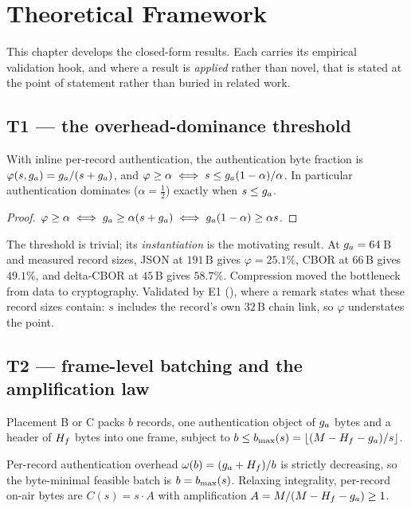 \chapter{Theoretical Framework}\label{ch:theory}

This chapter develops the closed-form results. Each carries its empirical validation hook, and
where a result is \emph{applied} rather than novel, that is stated at the point of statement rather
than buried in related work.

\section{T1 --- the overhead-dominance threshold}

\begin{theorem}\label{thm:t1}
With inline per-record authentication, the authentication byte fraction is
$\varphi(s, g_a) = g_a/(s + g_a)$, and $\varphi \geq \alpha \iff s \leq g_a(1-\alpha)/\alpha$. In
particular authentication dominates ($\alpha = \tfrac12$) exactly when $s \leq g_a$.
\end{theorem}

\begin{proof}
$\varphi \geq \alpha \iff g_a \geq \alpha(s + g_a) \iff g_a(1-\alpha) \geq \alpha s$.
\end{proof}

The threshold is trivial; its \emph{instantiation} is the motivating result. At $g_a = 64$\,B and
measured record sizes, JSON at $191$\,B gives $\varphi = 25.1\%$, CBOR at $66$\,B gives $49.1\%$,
and delta-CBOR at $45$\,B gives $58.7\%$. Compression moved the bottleneck from data to
cryptography. Validated by E1 (), where a remark states what these record sizes
contain: $s$ includes the record's own $32$\,B chain link, so $\varphi$ understates the point.

\section{T2 --- frame-level batching and the amplification law}

Placement B or C packs $b$ records, one authentication object of $g_a$ bytes and a header of $H_f$
bytes into one frame, subject to $b \leq b_{\max}(s) = \lfloor (M - H_f - g_a)/s \rfloor$.

\begin{proposition}\label{prop:t2}
Per-record authentication overhead $\omega(b) = (g_a + H_f)/b$ is strictly decreasing, so the
byte-minimal feasible batch is $b = b_{\max}(s)$. Relaxing integrality, per-record on-air bytes are
$C(s) = s \cdot A$ with amplification $A = M/(M - H_f - g_a) \geq 1$.
\end{proposition}

